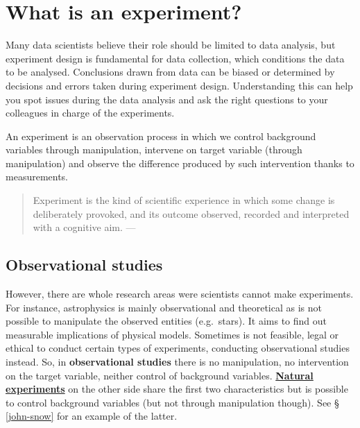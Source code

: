 \documentclass[
]{book}
\begin{document}
\hypertarget{what-is-an-experiment}{%
\section{What is an experiment?}\label{what-is-an-experiment}}

Many data scientists believe their role should be limited to data analysis, but experiment design is fundamental for data collection, which conditions the data to be analysed. Conclusions drawn from data can be biased or determined by decisions and errors taken during experiment design. Understanding this can help you spot issues during the data analysis and ask the right questions to your colleagues in charge of the experiments.

An experiment is an observation process in which we control background variables through manipulation, intervene on target variable (through manipulation) and observe the difference produced by such intervention thanks to measurements.

\begin{quote}
Experiment is the kind of scientific experience in which some change is deliberately provoked, and its outcome observed, recorded and interpreted with a cognitive aim. --- \citep{bunge2017philosophy}
\end{quote}

\hypertarget{observational-studies}{%
\subsection{Observational studies}\label{observational-studies}}

However, there are whole research areas were scientists cannot make experiments. For instance, astrophysics is mainly observational and theoretical as is not possible to manipulate the observed entities (e.g.~stars). It aims to find out measurable implications of physical models. Sometimes is not feasible, legal or ethical to conduct certain types of experiments, conducting observational studies instead. So, in \textbf{observational studies} there is no manipulation, no intervention on the target variable, neither control of background variables. \href{https://en.wikipedia.org/wiki/Natural_experiment}{\textbf{Natural experiments}} on the other side share the first two characteristics but is possible to control background variables (but not through manipulation though). See § \ref{john-snow} for an example of the latter.
\end{document}
